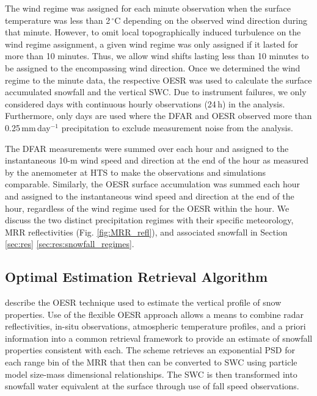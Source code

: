 \documentclass{ametsocV5}
\begin{document}
		The wind regime was assigned for each minute observation when the surface temperature was less than 2\,$^{\circ}$C depending on the observed wind direction during that minute. However, to omit local topographically induced turbulence on the wind regime assignment, a given wind regime was only assigned if it lasted for more than 10 minutes. Thus, we allow wind shifts lasting less than 10 minutes to be assigned to the encompassing wind direction. Once we determined the wind regime to the minute data, the respective OESR was used to calculate the surface accumulated snowfall and the vertical SWC. Due to instrument failures, we only considered days with continuous hourly observations (24\,h) in the analysis. Furthermore, only days are used where the DFAR and OESR observed more than 0.25\,mm\,day$^{-1}$ precipitation to exclude measurement noise from the analysis.	
		
		The DFAR measurements were summed over each hour and assigned to the instantaneous 10-m wind speed and direction at the end of the hour as measured by the anemometer at HTS to make the observations and simulations comparable. Similarly, the OESR surface accumulation was summed each hour and assigned to the instantaneous wind speed and direction at the end of the hour, regardless of the wind regime used for the OESR within the hour. We discuss the two distinct precipitation regimes with their specific meteorology, MRR reflectivities (Fig. \ref{fig:MRR_refl}), and associated snowfall in Section \ref{sec:res} \ref{sec:res:snowfall_regimes}.

	\subsection{Optimal Estimation Retrieval Algorithm}\label{sec:methodology:oesr}
		\citet{schirle_estimation_2019} describe the OESR technique used to estimate the vertical profile of snow properties. Use of the flexible OESR approach allows a means to combine radar reflectivities, in-situ observations, atmospheric temperature profiles, and a priori information into a common retrieval framework to provide an estimate of snowfall properties consistent with each. The scheme retrieves an exponential PSD for each range bin of the MRR that then can be converted to SWC using particle model size-mass dimensional relationships. The SWC is then transformed into snowfall water equivalent at the surface through use of fall speed observations. 
\end{document}
